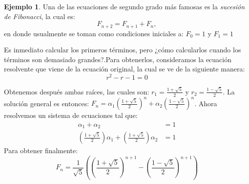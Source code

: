 \documentclass{report}
\theoremstyle{definition}
\newtheorem{ejemplo}[teorema]{Ejemplo}
\begin{document}
\begin{ejemplo}
Una de las ecuaciones de segundo grado más famosas es la \textit{sucesión de
  Fibonacci}, la cual es:
\begin{equation}
  \label{eq:fibonacci}
F_{n+2}=F_{n+1}+F_{n},  
\end{equation}
en donde usualmente se toman como condiciones iniciales a: $F_{0}=1$ y $F_{1}=1$

Es inmediato calcular los primeros términos, pero ¿cómo calcularlos
cuando los términos son demasiado grandes?.Para obtenerlos,
consideramos la ecuación resolvente que viene de la ecuación original,
la cual se ve de la siguiente manera:
$$r^2-r-1=0$$

Obtenemos después ambas raíces, las cuales son:
$r_{1}= \frac{1+\sqrt{5}}{2}$ y $r_{2}=\frac{1-\sqrt{5}}{2}$. La
solución general es entonces:
$F_{n}=\alpha_{1}(\frac{1+\sqrt{5}}{2})^{n} +
\alpha_{2}(\frac{1-\sqrt{5}}{2})^n$.
Ahora resolvemos un sistema de ecuaciones tal que:
\begin{align*}
\alpha_{1} + \alpha_{2} &= 1\\
(\frac{1+\sqrt{5}}{2})\alpha_{1} + (\frac{1+\sqrt{5}}{2})\alpha_{2}&=1
\end{align*}
Para obtener finalmente:
  $$F_{n} = \frac{1}{\sqrt{5}}((\frac{1+\sqrt{5}}{2})^{n+1}-(\frac{1-\sqrt{5}}{2})^{n+1})$$
\end{ejemplo}
\end{document}
